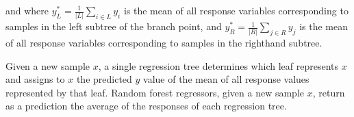 \documentclass{article} %
\begin{document}
and where $y_L^* = \frac{1}{\lvert L \rvert} \sum_{i \in L} y_i $ is the mean of all response variables corresponding to samples in the left subtree of the branch point, and $y_R^* = \frac{1}{\lvert R \rvert} \sum_{j \in R} y_j$ is the mean of all response variables corresponding to samples in the righthand subtree.

Given a new sample $x$, a single regression tree determines which leaf represents $x$ and assigns to $x$ the predicted $y$ value of the mean of all response values represented by that leaf. Random forest regressors, given a new sample $x$, return as a prediction the average of the responses of each regression tree.





\end{document}
